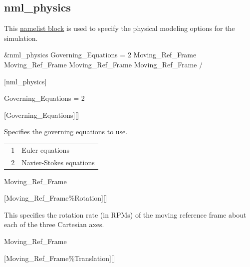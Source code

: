 \subsection{nml\_physics}
\label{SEC:nml_physics}

This \hyperref[SEC:User_Input]{namelist block}
is used to specify the physical modeling options
for the simulation.

\begin{nmlblocklst}[
,label={LST:nml_physics}
,caption={Namelist nml\_physics.}
]
&nml_physics
  Governing_Equations               = 2
  Moving_Ref_Frame%
  Moving_Ref_Frame%
  Moving_Ref_Frame%
  Moving_Ref_Frame%
/
\end{nmlblocklst}
\inp*[nmlPhysics]{}[nml\_physics]



\begin{nmldescitem}
Governing_Equations = 2
\end{nmldescitem}
[Governing\_Equations][]

\begin{nmldescbody}
Specifies the governing equations to use.

\begin{tabular}{ @{} r @{ = } p{0.85\linewidth} @{} }
  1 & Euler equations \\
  2 & Navier-Stokes equations
\end{tabular}
\end{nmldescbody}


\begin{nmldescitem}
Moving_Ref_Frame%
\end{nmldescitem}
[Moving\_Ref\_Frame\%Rotation][]

\begin{nmldescbody}
This specifies the rotation rate (in RPMs) of the moving reference frame
about each of the three Cartesian axes.
\end{nmldescbody}


\begin{nmldescitem}
Moving_Ref_Frame%
\end{nmldescitem}
[Moving\_Ref\_Frame\%Translation][]

